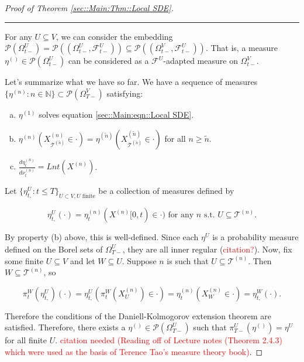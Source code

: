 \documentclass[12pt]{article}
\newcommand{\mb}{\mathbb}
\newcommand{\mc}{\mathcal}
\newcommand{\ms}{\mathscr}
\newcommand{\te}{\text}
\newcommand{\tr}{\textcolor{red}}
\newcommand{\ind}{\hspace{24pt}}
\newcommand{\lin}{\rule{\linewidth}{0.4 pt}}
\newcommand{\pmsr}{\mc{P}}							%
\renewcommand{\U}{U}							%
\newcommand{\UU}{W}								%
\newcommand{\T}{T}								%
\renewcommand{\t}{t}							%
\newcommand{\sset}{\Omega}						%
\newcommand{\proj}{\pi}							%
\renewcommand{\tt}{s}							%
\newcommand{\F}{\mc{F}}							%
\newcommand{\X}{X}								%
\newcommand{\vind}[1]{^{#1}}					%
\newcommand{\vsi}[1]{^{#1}}						%
\newcommand{\cind}[1]{_{#1}}					%
\newcommand{\tip}[1]{#1}						%
\newcommand{\ts}[1]{_{#1}}						%
\newcommand{\tree}{\mc{T}}						%
\newcommand{\sln}[1]{^{(#1)}}						%
\newcommand{\alt}[1]{\widetilde{#1}}			%
\newcommand{\mm}{\nu}							%
\newcommand{\mmm}{\eta}							%
\newcommand{\dense}{L}							%
\begin{document}
\begin{proof}[Proof of Theorem \ref{sec::Main:Thm::Local SDE}]
\lin

For any \(\U\subseteq V\), we can consider the embedding \(\pmsr\left(\sset\vsi{\U}\ts{\t-}\right) = \pmsr\left((\sset\vsi{\U}\ts{\t-},\F\vsi{\U}\ts{\t-})\right) \subseteq \pmsr\left((\sset\vsi{V}\ts{\t-},\F\vsi{\U}\ts{\t-})\right)\). That is, a measure \(\mmm\sln{}\ts{}\in \pmsr\left(\sset\vsi{\U}\ts{\t-}\right)\) can be considered as a \(\F\vsi{\U}\ts{}\)-adapted measure on \(\sset\vsi{V}\ts{\t-}\).

\ind Let's summarize what we have so far. We have a sequence of measures \(\{\mmm\sln{n}\ts{}:n\in\mb{N}\} \subset \pmsr(\sset\vsi{V}\ts{\T-})\) satisfying:

\begin{enumerate}[(a)]
\item \(\mmm\sln{1}\ts{}\) solves equation \eqref{sec::Main:eqn::Local SDE}.

\item \(\mmm\sln{n}\ts{}(\X\sln{n}\cind{\tree\sln{\alt{n}}}\tip{} \in \cdot) = \mmm\sln{\alt{n}}\ts{}(\X\sln{\alt{n}}\cind{\tree\sln{\alt{n}}}\tip{}\in \cdot)\) for all \(n \geq \alt{n}\).

\item \(\frac{d\mmm\sln{n}\ts{\t}}{d\mm\sln{n}\ts{\t}} = \dense{n}{\t}(\X\sln{n}\cind{}\tip{})\).
\end{enumerate}

Let \(\{\mmm\vind{\U}\ts{\t,}:\t \leq \T\}_{\U\subset V,\U\te{ finite}}\) be a collection of measures defined by

\[\mmm\vind{\U}\ts{\t,}(\cdot) = \mmm\sln{n}\ts{\t}(\X\sln{n}\cind{}\tip{[0,\t)} \in \cdot) \te{ for any }n\te{ \tt.\t. }\U \subseteq \tree\sln{n}.\]

By property (b) above, this is well-defined. Since each \(\mmm\vind{\U}\ts{}\) is a probability measure defined on the Borel sets of \(\sset\vsi{\U}\ts{\T-}\), they are all inner regular (\tr{citation?}). Now, fix some finite \(\U\subseteq V\) and let \(\UU \subseteq \U\). Suppose \(n\) is such that \(\U \subseteq \tree\sln{n}\). Then \(\UU\subseteq \tree\sln{n}\), so

\[\proj\vsi{\UU}\ts{\t}(\mmm\vind{\U}\ts{\t,})(\cdot) = \mmm\vind{\U}\ts{\t,}\left(\proj\vsi{\UU}\ts{\t}(\X\sln{n}\cind{\U}\tip{}) \in \cdot\right) = \mmm\sln{n}\ts{\t}\left(\X\sln{n}\cind{\UU}\tip{} \in \cdot\right) = \mmm\vind{\UU}\ts{\t,}(\cdot).\]

Therefore the conditions of the Daniell-Kolmogorov extension theorem are satisfied. Therefore, there exists a \(\mmm\sln{}\ts{}\in \ms{P}(\sset\vsi{\U}\ts{\T-})\) such that \(\proj\vsi{\U}\ts{\T-}(\mmm\sln{}\ts{}) =\mmm\vind{\U}\ts{}\) for all finite \(\U\). \tr{citation needed (Reading off of Lecture notes (Theorem 2.4.3) which were used as the basis of Terence Tao's measure theory book)}.


\end{proof}
\end{document}

